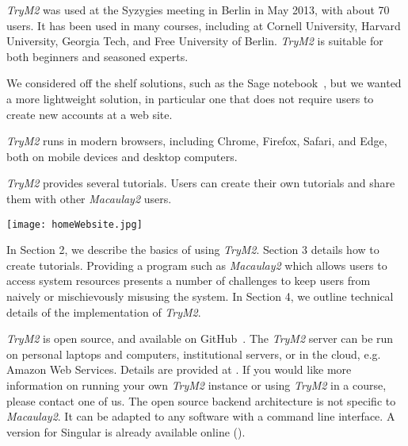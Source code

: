 \documentclass[twocolumn]{article}
\def\trym2{{\it TryM2}}
\def\M2{{\it Macaulay2}}
\begin{document}
\trym2 was used at the Syzygies
meeting in Berlin in May 2013, with about 70 users. It has been used in many courses, including at Cornell
University, Harvard University, Georgia Tech, and Free University of
Berlin. \trym2 is suitable for both beginners and seasoned experts.

We considered off the shelf solutions, such as the Sage
notebook~\cite{sagenotebook}, but we wanted a more
lightweight solution, in particular one that does not require users to create
new accounts at a web site.

\trym2 runs in modern browsers, including Chrome, Firefox, Safari, and Edge, both on mobile devices and desktop
computers.

\trym2 provides several tutorials. Users can create their own
tutorials and share them with other \M2 users.

\begin{figure*}[htb]
    \texttt{[image: homeWebsite.jpg]}
    \caption{A typical view of \trym2. The left hand
        side shows a tutorial giving an introduction to Gr\"obner
        bases. Text in yellow boxes can be clicked and is then executed by
        \M2 on the server. The complete output of the calculations
        is show on the right hand side. Clicking {\it Home, Tutorial, Editor, About}
        changes the left hand view, {\it Reset, Interrupt}
        reset and interrupt the \M2 session on the server, {\it
        Save} provides both the input and the output of the current
        session to the user as a text file, and {\it Upload File} uploads files
        that can then be accessed by \M2.}
\label{fig:home}
\end{figure*}

In Section 2, we describe the basics of using \trym2.
Section 3 details how to create tutorials.
Providing a program such as \M2 which allows users to
access system resources presents a number of challenges to keep users
from naively or mischievously misusing the system.  In Section 4, we
outline technical details of the implementation of \trym2.

\trym2 is open source, and available on GitHub~\cite{github}.  The
\trym2 server can be run on personal laptops and computers,
institutional servers, or in the cloud, e.g. Amazon Web Services.
Details are provided at \cite{github}.  If you would like more
information on running your own \trym2 instance or using \trym2 in a
course, please contact one of us.  The open source backend
architecture is not specific to \M2.  It can be adapted to any
software with a command line interface.  A version for Singular
is already available online (\cite{trySingular}).
\end{document}
